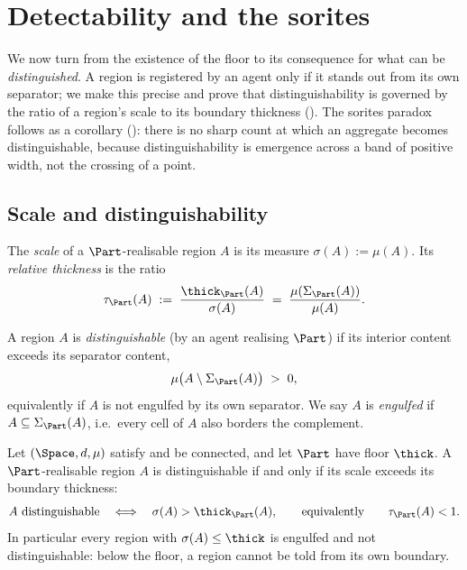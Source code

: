 
\section{Detectability and the sorites}
\label{sec:detect}

We now turn from the existence of the floor to its consequence for what can be
\emph{distinguished}. A region is registered by an agent only if it stands out
from its own separator; we make this precise and prove that distinguishability is
governed by the ratio of a region's scale to its boundary thickness
(). The sorites paradox follows as a corollary
(): there is no sharp count at which an aggregate becomes
distinguishable, because distinguishability is emergence across a band of
positive width, not the crossing of a point.

\subsection{Scale and distinguishability}

\begin{definition}
\label{def:scale}
The \emph{scale} of a $\Part$-realisable region $A$ is its measure
$\sigma(A):=\mu(A)$. Its \emph{relative thickness} is the ratio
\[
\tau_\Part(A)\;:=\;\frac{\thick_\Part(A)}{\sigma(A)}
\;=\;\frac{\mu(\Sigma_\Part(A))}{\mu(A)} .
\]
\end{definition}

\begin{definition}
\label{def:distinguishable}
A region $A$ is \emph{distinguishable} \textup{(}by an agent realising
$\Part$\textup{)} if its interior content exceeds its separator content,
\[
\mu\bigl(A\setminus\Sigma_\Part(A)\bigr)\;>\;0,
\]
equivalently if $A$ is not engulfed by its own separator. We say $A$ is
\emph{engulfed} if $A\subseteq\Sigma_\Part(A)$, i.e.\ every cell of $A$ also
borders the complement.
\end{definition}

\begin{theorem}[Detectability]
\label{thm:detectability}
Let $(\Space,d,\mu)$ satisfy  and be connected, and let $\Part$ have
floor $\thick$. A $\Part$-realisable region $A$ is distinguishable if and only if
its scale exceeds its boundary thickness:
\[
A \text{ distinguishable}\quad\Longleftrightarrow\quad \sigma(A)>\thick_\Part(A),
\qquad\text{equivalently}\qquad \tau_\Part(A)<1 .
\]
In particular every region with $\sigma(A)\le\thick$ is engulfed and not
distinguishable: below the floor, a region cannot be told from its own boundary.
\end{theorem}


